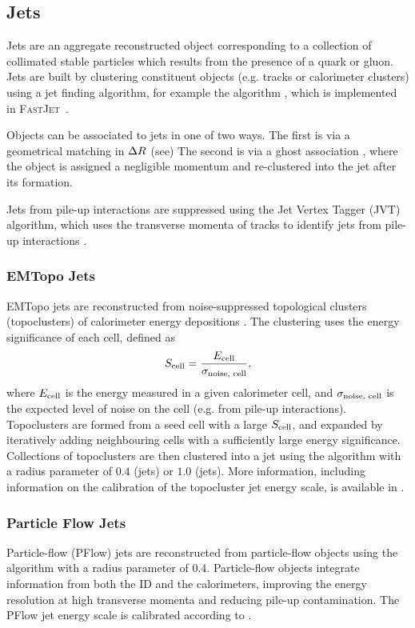 \subsection{Jets}\label{sec:jet_reco}
Jets are an aggregate reconstructed object corresponding to a collection of collimated stable particles which results from the presence of a quark or gluon.
Jets are built by clustering constituent objects (e.g. tracks or calorimeter clusters) using a jet finding algorithm, for example the \antikt algorithm \cite{Cacciari:2008gp}, which is implemented in \textsc{FastJet}~\cite{Cacciari:2012:fastjet}.

Objects can be associated to jets in one of two ways.
The first is via a geometrical matching in $\Delta R$ (see) 
The second is via a ghost association \cite{Cacciari:2008gn}, where the object is assigned a negligible momentum and re-clustered into the jet after its formation.

Jets from pile-up interactions are suppressed using the Jet Vertex Tagger (JVT) algorithm, which uses the transverse momenta of tracks to identify jets from pile-up interactions \cite{ATLAS-CONF-2014-018}.



\subsubsection{EMTopo Jets}
EMTopo jets are reconstructed from noise-suppressed topological clusters (topoclusters) of calorimeter energy depositions \cite{PERF-2014-07}.
The clustering uses the energy significance of each cell, defined as 
%
\begin{equation}
  S_\textnormal{cell} = \frac{E_\textnormal{cell}}{\sigma_\textnormal{noise, cell}} ,
\end{equation}
%
where $E_\textnormal{cell}$ is the energy measured in a given calorimeter cell, and $\sigma_\textnormal{noise, cell}$ is the expected level of noise on the cell (e.g. from pile-up interactions).
Topoclusters are formed from a seed cell with a large $S_\textnormal{cell}$, and expanded by iteratively adding neighbouring cells with a sufficiently large energy significance.
Collections of topoclusters are then clustered into a jet 
using the \antikt algorithm with a radius parameter of $0.4$ (\smallR jets) or $1.0$ (\largeR jets).
More information, including information on the calibration of the topocluster jet energy scale, is available in .


\subsubsection{Particle Flow Jets}
Particle-flow (PFlow) jets are reconstructed from particle-flow objects \cite{PERF-2015-09} using the \antikt algorithm with a radius parameter of $0.4$.
Particle-flow objects integrate information from both the ID and the calorimeters, improving the energy resolution at high transverse momenta and reducing pile-up contamination.
The PFlow jet energy scale is calibrated according to .

